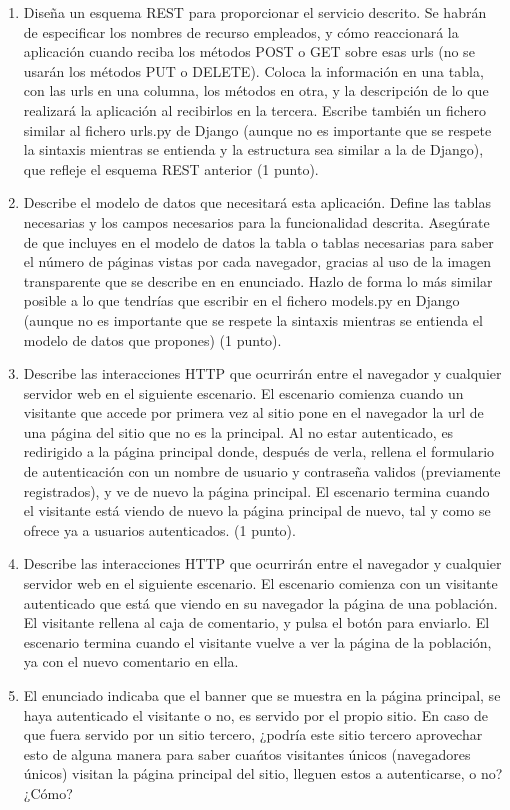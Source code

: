 \begin{enumerate}
\item Diseña un esquema REST para proporcionar el servicio descrito. Se habrán de especificar los nombres de recurso empleados, y cómo reaccionará la aplicación cuando reciba los métodos POST o GET sobre esas urls (no se usarán los métodos PUT o DELETE). Coloca la información en una tabla, con las urls en una columna, los métodos en otra, y la descripción de lo que realizará la aplicación al recibirlos en la tercera. Escribe también un fichero similar al fichero urls.py de Django (aunque no es importante que se respete la sintaxis mientras se entienda y la estructura sea similar a la de Django), que refleje el esquema REST anterior (1 punto).

\item Describe el modelo de datos que necesitará esta aplicación. Define las tablas necesarias y los campos necesarios para la funcionalidad descrita. Asegúrate de que incluyes en el modelo de datos la tabla o tablas necesarias para saber el número de páginas vistas por cada navegador, gracias al uso de la imagen transparente que se describe en en enunciado. Hazlo de forma lo más similar posible a lo que tendrías que escribir en el fichero models.py en Django (aunque no es importante que se respete la sintaxis mientras se entienda el modelo de datos que propones) (1 punto).

\item Describe las interacciones HTTP que ocurrirán entre el navegador y cualquier servidor web en el siguiente escenario. El escenario comienza cuando un visitante que accede por primera vez al sitio pone en el navegador la url de una página del sitio que no es la principal. Al no estar autenticado, es redirigido a la página principal donde, después de verla, rellena el formulario de autenticación con un nombre de usuario y contraseña validos (previamente registrados), y ve de nuevo la página principal. El escenario termina cuando el visitante está viendo de nuevo la página principal de nuevo, tal y como se ofrece ya a usuarios autenticados. (1 punto).

\item Describe las interacciones HTTP que ocurrirán entre el navegador y cualquier servidor web en el siguiente escenario. El escenario comienza con un visitante autenticado que está que viendo en su navegador la página de una población. El visitante rellena al caja de comentario, y pulsa el botón para enviarlo. El escenario termina cuando el visitante vuelve a ver la página de la población, ya con el nuevo comentario en ella.

\item El enunciado indicaba que el banner que se muestra en la página principal, se haya autenticado el visitante o no, es servido por el propio sitio. En caso de que fuera servido por un sitio tercero, ¿podría este sitio tercero aprovechar esto de alguna manera para saber cuańtos visitantes únicos (navegadores únicos) visitan la página principal del sitio, lleguen estos a autenticarse, o no? ¿Cómo? 
\end{enumerate}

